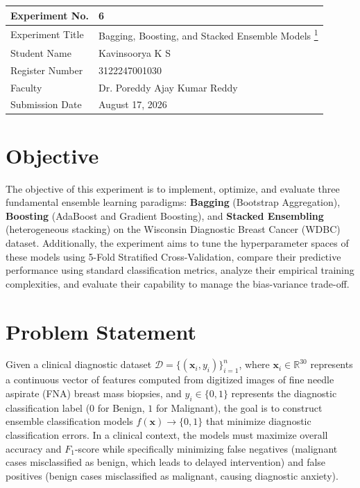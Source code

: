 \documentclass[12pt,a4paper]{article}
\begin{document}
\begin{tabular}{|p{4cm}|p{11cm}|}
\hline
Experiment No. & 6 \\ \hline
Experiment Title & Bagging, Boosting, and Stacked Ensemble Models \href{https://github.com/Kavin-ks/Machine-Learning-Projects}{\textsuperscript{1}}\\ \hline
Student Name & Kavinsoorya K S \\ \hline
Register Number & 3122247001030 \\ \hline
Faculty & Dr. Poreddy Ajay Kumar Reddy \\ \hline
Submission Date & August 17, 2026 \\ \hline
\end{tabular}

\vspace{0.5cm}

\section{Objective}
The objective of this experiment is to implement, optimize, and evaluate three fundamental ensemble learning paradigms: \textbf{Bagging} (Bootstrap Aggregation), \textbf{Boosting} (AdaBoost and Gradient Boosting), and \textbf{Stacked Ensembling} (heterogeneous stacking) on the Wisconsin Diagnostic Breast Cancer (WDBC) dataset. Additionally, the experiment aims to tune the hyperparameter spaces of these models using 5-Fold Stratified Cross-Validation, compare their predictive performance using standard classification metrics, analyze their empirical training complexities, and evaluate their capability to manage the bias-variance trade-off.

\section{Problem Statement}
Given a clinical diagnostic dataset $\mathcal{D} = \{(\mathbf{x}_i, y_i)\}_{i=1}^n$, where $\mathbf{x}_i \in \mathbb{R}^{30}$ represents a continuous vector of features computed from digitized images of fine needle aspirate (FNA) breast mass biopsies, and $y_i \in \{0, 1\}$ represents the diagnostic classification label ($0$ for Benign, $1$ for Malignant), the goal is to construct ensemble classification models $f(\mathbf{x}) \to \{0, 1\}$ that minimize diagnostic classification errors. In a clinical context, the models must maximize overall accuracy and $F_1$-score while specifically minimizing false negatives (malignant cases misclassified as benign, which leads to delayed intervention) and false positives (benign cases misclassified as malignant, causing diagnostic anxiety).
\end{document}
